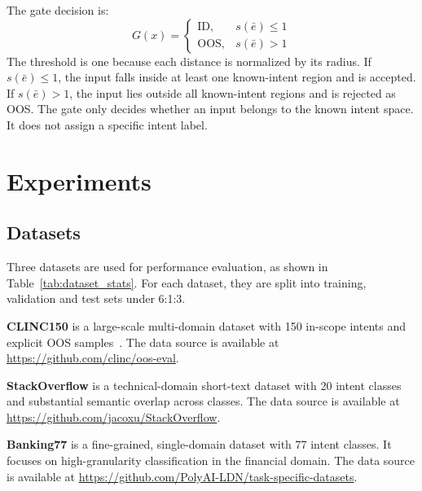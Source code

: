 \documentclass[11pt]{article}
\begin{document}
The gate decision is:
\begin{equation}
G(x)=
\begin{cases}
\mathrm{ID}, & s(\bar{e}) \le 1 \\
\mathrm{OOS}, & s(\bar{e}) > 1
\end{cases}
\end{equation}
The threshold is one because each distance is normalized by its radius. If $s(\bar{e}) \le 1$, the input falls inside at least one known-intent region and is accepted. If $s(\bar{e}) > 1$, the input lies outside all known-intent regions and is rejected as OOS. The gate only decides whether an input belongs to the known intent space. It does not assign a specific intent label.

\section{Experiments}
\subsection{Datasets}
Three datasets are used for performance evaluation, as shown in Table~\ref{tab:dataset_stats}. For each dataset, they are split into training, validation and test sets under 6:1:3.

\textbf{CLINC150} is a large-scale multi-domain dataset with 150 in-scope intents and explicit OOS samples~\citep{larson2019evaluation}. The data source is available at \url{https://github.com/clinc/oos-eval}.

\textbf{StackOverflow} is a technical-domain short-text dataset with 20 intent classes and substantial semantic overlap across classes. The data source is available at \url{https://github.com/jacoxu/StackOverflow}.

\textbf{Banking77} is a fine-grained, single-domain dataset with 77 intent classes. It focuses on high-granularity classification in the financial domain. The data source is available at \url{https://github.com/PolyAI-LDN/task-specific-datasets}.

\begin{table}[H]
\centering
\renewcommand{\arraystretch}{1.05}
\caption{Dataset statistics.}
\label{tab:dataset_stats}
\end{table}
\end{document}
